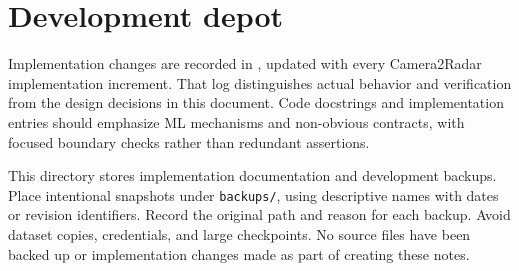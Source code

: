 \documentclass[11pt,a4paper]{article}
\begin{document}
\section{Development depot}
Implementation changes are recorded in , updated with every Camera2Radar implementation increment. That log distinguishes actual behavior and verification from the design decisions in this document. Code docstrings and implementation entries should emphasize ML mechanisms and non-obvious contracts, with focused boundary checks rather than redundant assertions.

This directory stores implementation documentation and development backups. Place intentional snapshots under \texttt{backups/}, using descriptive names with dates or revision identifiers. Record the original path and reason for each backup. Avoid dataset copies, credentials, and large checkpoints. No source files have been backed up or implementation changes made as part of creating these notes.
\end{document}
